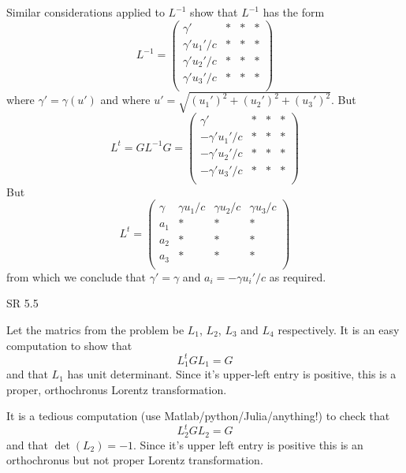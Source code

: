 \documentclass[minion]{homework}
\begin{document}
\begin{aproblems}
Similar considerations applied to $L^{-1}$ show that $L^{-1}$ has the form
\begin{equation}
L^{-1} = \begin{pmatrix} \gamma' & * & * & * \\
\gamma' u_1'/c &  * & * & *  \\
\gamma' u_2'/c &  * & * & *  \\
\gamma' u_3'/c &  * & * & *  \\
\end{pmatrix}
\end{equation}
where $\gamma'=\gamma(u')$ and where $u'=\sqrt{(u_1')^2+(u_2')^2+(u_3')^2}$.  But
\begin{equation}
L^t = G L^{-1} G = \begin{pmatrix} \gamma' & * & * & * \\
-\gamma' u_1'/c &  * & * & *  \\
-\gamma' u_2'/c &  * & * & *  \\
-\gamma' u_3'/c &  * & * & *  \\
\end{pmatrix}
\end{equation}
But
\begin{equation}
L^t = \begin{pmatrix} \gamma & \gamma u_1/c & \gamma u_2/c & \gamma u_3/c \\
a_1 &  * & * & *  \\
a_2 &  * & * & *  \\
a_3 &  * & * & *  \\
\end{pmatrix}
\end{equation}
from which we conclude that $\gamma'=\gamma$ and $a_i = - \gamma u_i'/c$
as required.

\hproblem SR 5.5
\solution

Let the matrics from the problem be $L_1$, $L_2$, $L_3$ and $L_4$
respectively.  It is an easy computation to show that
\[
L_1^t G L_1 = G
\]
and that $L_1$ has unit determinant.  Since it's upper-left entry is
positive, this is a proper, orthochronus Lorentz transformation.

It is a tedious computation (use Matlab/python/Julia/anything!) to check
that
\[
L_2^t G L_2 = G
\]
and that $\det(L_2)=-1$.  Since it's upper left entry is positive this
is an orthochronus but not proper Lorentz transformation.


\end{aproblems}
\end{document}
